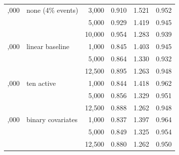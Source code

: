 \begin{tabular}{rlrrrr}
\addlinespace
50,000 & none (4\% events) & 3,000 & 0.910 & 1.521 & 0.952\\
 &  & 5,000 & 0.929 & 1.419 & 0.945\\
 &  & 10,000 & 0.954 & 1.283 & 0.939\\
\addlinespace
25,000 & linear baseline & 1,000 & 0.845 & 1.403 & 0.945\\
 &  & 5,000 & 0.864 & 1.330 & 0.932\\
 &  & 12,500 & 0.895 & 1.263 & 0.948\\
\addlinespace
25,000 & ten active & 1,000 & 0.844 & 1.418 & 0.962\\
 &  & 5,000 & 0.856 & 1.329 & 0.951\\
 &  & 12,500 & 0.888 & 1.262 & 0.948\\
\addlinespace
25,000 & binary covariates & 1,000 & 0.837 & 1.397 & 0.964\\
 &  & 5,000 & 0.849 & 1.325 & 0.954\\
 &  & 12,500 & 0.880 & 1.262 & 0.950\\
\bottomrule
\end{tabular}
